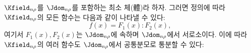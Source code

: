 
$\Kfield_{n\rho}$를 $\Jdom_{n\rho}$를 포함하는 최소 체(體)라 하자. 그러면 정의에 따라 $\Kfield_{n\rho}$의 모든 함수는 다음과 같이 나타낼 수 있다:
\[
f(x)=F_1(x):F_2(x),
\]
여기서 $F_1(x),F_2(x)$는 $\Jdom_{n\rho}$에 속하며 $\Jdom_{n\rho}$에서 서로소이다. 이에 따라 $\Kfield_{n\rho}$의 여러 함수도 $\Jdom_{n\rho}$에서 공통분모로 통분할 수 있다:
